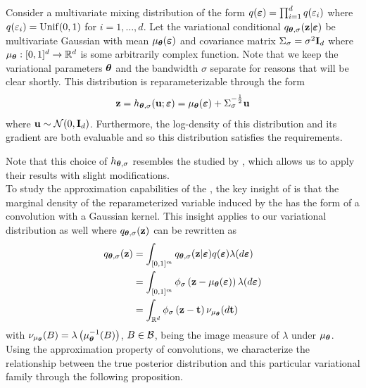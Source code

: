 \documentclass[10pt]{article}
\begin{document}
Consider a multivariate mixing distribution of the form $q(\bm{\varepsilon})=\prod_{i=1}^dq(\varepsilon_i)$ where $q(\varepsilon_i)=\mathrm{Unif}(0,1)$ for $i=1,\ldots,d$. Let the variational conditional $q_{{\bm{\theta}},\sigma}(\mathbf{z}|\bm{\varepsilon})$ be multivariate Gaussian with mean $\mu_{{\bm{\theta}}}(\bm{\varepsilon})$ and covariance matrix $\Sigma_{\sigma}=\sigma^2\mathbf{I}_d$ where $\mu_{\bm{\theta}}:[0,1]^d\rightarrow\mathbb{R}^d$ is some arbitrarily complex function. Note that we keep the variational parameters ${\bm{\theta}}$ and the bandwidth $\sigma$ separate for reasons that will be clear shortly. This distribution is reparameterizable through the form
\[
\mathbf{z} = h_{{\bm{\theta}},\sigma}(\mathbf{u};\bm{\varepsilon}) = \mu_{\bm{\theta}}(\bm{\varepsilon}) + \Sigma_{\sigma}^{-\frac{1}{2}}\mathbf{u}
\]
where $\mathbf{u}\sim \mathcal{N}(0,\mathbf{I}_d)$. Furthermore, the log-density of this distribution and its gradient are both evaluable and so this distribution satisfies the \uivi requirements.

Note that this choice of $h_{{\bm{\theta}},\sigma}$ resembles the \nllvm studied by \citet{Plummer:2021}, which allows us to apply their results with slight modifications.
\\

To study the approximation capabilities of the \nllvm, the key insight of \citet{Plummer:2021} is that the marginal density of the reparameterized variable induced by the \nllvm has the form of a convolution with a Gaussian kernel. This insight applies to our \uivi variational distribution as well where $q_{{\bm{\theta}},\sigma}(\mathbf{z})$ can be rewritten as
\begin{align*}
q_{{\bm{\theta}},\sigma}(\mathbf{z}) &= \int_{[0,1]^m} q_{{\bm{\theta}},\sigma}(\mathbf{z}|\bm{\varepsilon})q(\bm{\varepsilon})\lambda(d\bm{\varepsilon}) \\
&= \int_{[0,1]^m} \phi_\sigma\left(\mathbf{z}-\mu_{\bm{\theta}}(\bm{\varepsilon})\right)\lambda(d\bm{\varepsilon}) \\
&= \int_{\mathbb{R}^d} \phi_\sigma\left(\mathbf{z}-\mathbf{t}\right)\nu_{\mu_{\bm{\theta}}}(d\mathbf{t})
\end{align*}
with $\nu_{\mu_{\bm{\theta}}}(B)=\lambda\left(\mu_{\bm{\theta}}^{-1}(B)\right)$, $B\in\mathcal{B}$, being the image measure of $\lambda$ under $\mu_{\bm{\theta}}$. Using the approximation property of convolutions, we characterize the relationship between the true posterior distribution and this particular variational family through the following proposition.
\end{document}
